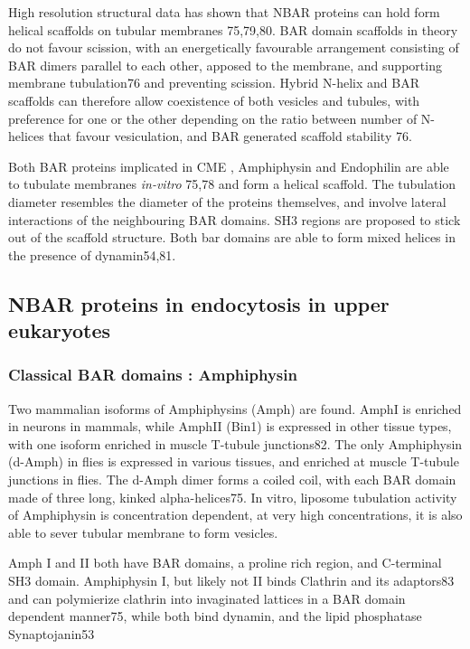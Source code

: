 	\vspace{5mm}
	High resolution structural data has shown that NBAR proteins can hold form helical scaffolds on tubular membranes 75,79,80. BAR domain scaffolds in theory do not favour scission, with an energetically favourable arrangement consisting of BAR dimers parallel to each other, apposed to the membrane, and supporting membrane tubulation76 and preventing scission. Hybrid N-helix and BAR scaffolds can therefore allow coexistence of both vesicles and tubules, with preference for one or the other depending on the ratio between number of N-helices that favour vesiculation, and BAR generated scaffold stability 76. 

	\vspace{5mm}
	Both BAR proteins implicated in CME , Amphiphysin and Endophilin are able to tubulate membranes \textit{in-vitro} 75,78 and form a helical scaffold. The tubulation diameter resembles the diameter of the proteins themselves, and involve lateral interactions of the neighbouring BAR domains. SH3 regions are proposed to stick out of the scaffold structure. Both bar domains are able to form mixed helices in the presence of dynamin54,81. 

	\subsection{NBAR proteins in endocytosis in upper eukaryotes}		
		\subsubsection{Classical BAR domains : Amphiphysin}
		Two mammalian isoforms of Amphiphysins (Amph) are found. AmphI is enriched in neurons in mammals, while AmphII (Bin1) is expressed in other tissue types, with one isoform enriched in muscle T-tubule junctions82. The only Amphiphysin (d-Amph) in flies is expressed in various tissues, and enriched at muscle T-tubule junctions in flies. The d-Amph dimer forms a coiled coil, with each BAR domain made of three long, kinked alpha-helices75. In vitro, liposome tubulation activity of Amphiphysin is concentration dependent, at very high concentrations, it is also able to sever tubular membrane to form vesicles. 

		\vspace{5mm}
		Amph I and II both have BAR domains, a proline rich region, and C-terminal SH3 domain. Amphiphysin I, but likely not II binds Clathrin and its adaptors83 and can polymierize clathrin into invaginated lattices in a BAR domain dependent manner75, while both bind dynamin, and the lipid phosphatase Synaptojanin53


